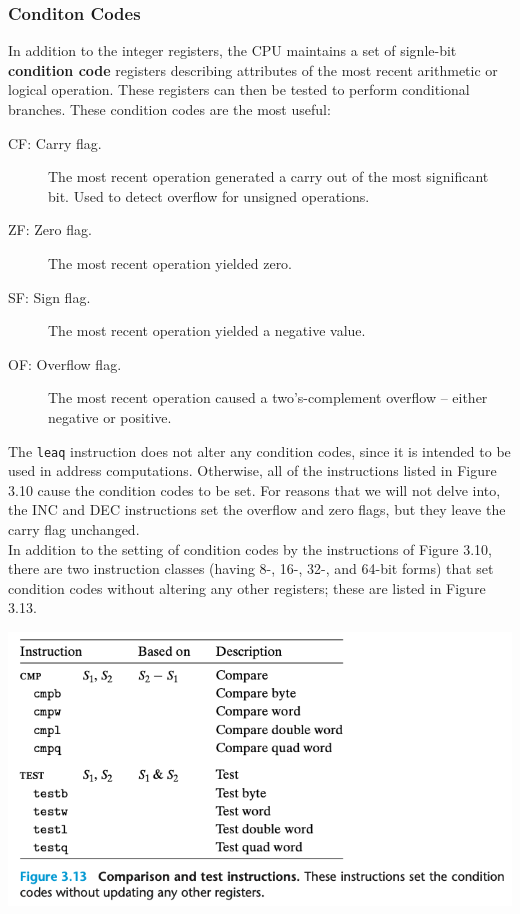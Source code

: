 \documentclass[11pt]{article}
\begin{document}
\subsubsection{Conditon Codes}
\label{sec:orgc80c6a3}
In addition to the integer registers, the CPU maintains a set of signle-bit \textbf{condition code} registers describing attributes of the most recent arithmetic or logical operation. These registers can then be tested to perform conditional branches. These condition codes are the most useful:\\
\begin{description}
\item[{CF: Carry flag.}] The most recent operation generated a carry out of the most significant bit. Used to detect overflow for unsigned operations.\\
\item[{ZF: Zero flag.}] The most recent operation yielded zero.\\
\item[{SF: Sign flag.}] The most recent operation yielded a negative value.\\
\item[{OF: Overflow flag.}] The most recent operation caused a two's-complement overflow -- either negative or positive.\\
\end{description}


The \texttt{leaq} instruction does not alter any condition codes, since it is intended to be used in address computations. Otherwise, all of the instructions listed in Figure 3.10 cause the condition codes to be set. For reasons that we will not delve into, the INC and DEC instructions set the overflow and zero flags, but they leave the carry flag unchanged.\\


In addition to the setting of condition codes by the instructions of Figure 3.10, there are two instruction classes (having 8-, 16-, 32-, and 64-bit forms) that set condition codes without altering any other registers; these are listed in Figure 3.13.\\

\begin{center}
\includegraphics[width=.9\linewidth]{pics/comparison-and-test-instructions.png}
\end{center}
\end{document}

